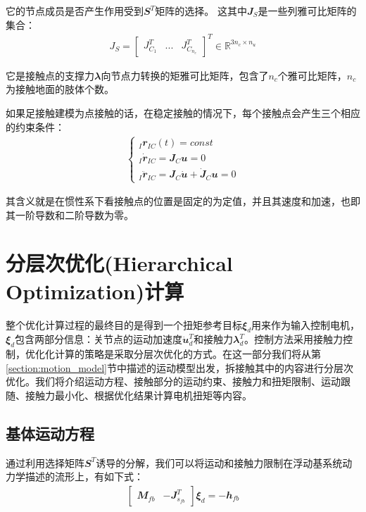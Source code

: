 它的节点成员是否产生作用受到${\mathbfit S}^T$矩阵的选择。
这其中${\mathbfit J}_S$是一些列雅可比矩阵的集合：
\begin{align}
    J_S=\begin{bmatrix}J^T_{C_1} & ... & J^T_{C_{n_c}}\end{bmatrix}^T  \in {\mathbb R}^{3n_c\times n_u}
\end{align}

它是接触点的支撑力${\mathbfit \lambda}$向节点力转换的矩雅可比矩阵，包含了$n_c$个雅可比矩阵，$n_c$为接触地面的肢体个数。

如果足接触建模为点接触的话，在稳定接触的情况下，每个接触点会产生三个相应的约束条件：
\begin{align}
    \label{eq:contact_constrains}
    \begin{cases}
        _I\mathbfit{r}_{IC}(t)=const\\
        _I \mathbfit{\dot r}_{IC}=\mathbfit{J}_C\mathbfit{u}=0\\
        _I\mathbfit{\ddot r}_{IC}=\mathbfit{J}_C \mathbfit{\dot u}+\mathbfit{\dot J}_C\mathbfit{u}=0
    \end{cases}
\end{align}

其含义就是在惯性系下看接触点的位置是固定的为定值，并且其速度和加速，也即其一阶导数和二阶导数为零。











\section[分层次优化(Hierarchical Optimization)计算]{\label{section:hierarchical_opt}分层次优化(Hierarchical Optimization)计算\cite[p2]{Bellicoso_Jenelten_Fankhauser_Gehring_Hwangbo_Hutter_2017}}

整个优化计算过程的最终目的是得到一个扭矩参考目标${\mathbfit \xi}_d$用来作为输入控制电机，${\mathbfit \xi}_d$包含两部分信息：关节点的运动加速度$\mathbfit{\dot u}_d^T$和接触力$\mathbfit{\lambda}_d^T$。控制方法采用接触力控制，优化化计算的策略是采取分层次优化的方式。在这一部分我们将从第\ref{section:motion_model}节中描述的运动模型出发，拆接触其中的内容进行分层次优化。我们将介绍运动方程、接触部分的运动约束、接触力和扭矩限制、运动跟随、接触力最小化、根据优化结果计算电机扭矩等内容。

\subsection[基体运动方程]{基体运动方程}
通过利用选择矩阵$\mathbfit{S}^T$诱导的分解，我们可以将运动和接触力限制在浮动基系统动力学描述的流形上，有如下式：
\begin{align}
    \begin{bmatrix}{\mathbfit M}_{fb} & - {\mathbfit J}_{s_{fb}}^T \end{bmatrix} {\mathbfit \xi}_d = - {\mathbfit h}_{fb}
\end{align}


